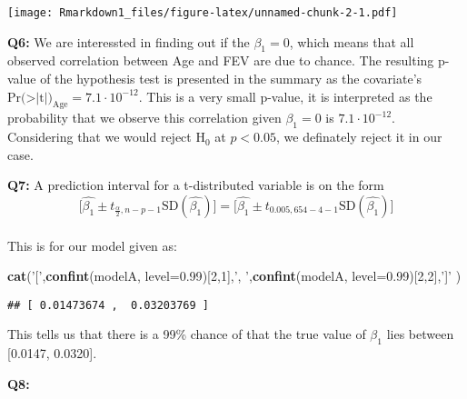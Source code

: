 \documentclass[]{article}
\newenvironment{Shaded}{\begin{snugshade}}{\end{snugshade}}
\newcommand{\KeywordTok}[1]{\textcolor[rgb]{0.13,0.29,0.53}{\textbf{#1}}}
\newcommand{\DataTypeTok}[1]{\textcolor[rgb]{0.13,0.29,0.53}{#1}}
\newcommand{\DecValTok}[1]{\textcolor[rgb]{0.00,0.00,0.81}{#1}}
\newcommand{\FloatTok}[1]{\textcolor[rgb]{0.00,0.00,0.81}{#1}}
\newcommand{\StringTok}[1]{\textcolor[rgb]{0.31,0.60,0.02}{#1}}
\newcommand{\NormalTok}[1]{#1}
\begin{document}
\texttt{[image: Rmarkdown1\_files/figure-latex/unnamed-chunk-2-1.pdf]}

\textbf{Q6:} We are interessted in finding out if the \(\beta_1 = 0\),
which means that all observed correlation between Age and FEV are due to
chance. The resulting p-value of the hypothesis test is presented in the
summary as the covariate's
\(\text{Pr(>|t|)}_{\text{Age}} = 7.1\cdot 10^{-12}\). This is a very
small p-value, it is interpreted as the probability that we observe this
correlation given \(\beta_1 = 0\) is \(7.1 \cdot 10^{-12}\). Considering
that we would reject \(\text{H}_0\) at \(p < 0.05\), we definately
reject it in our case.

\textbf{Q7:} A prediction interval for a t-distributed variable is on
the form
\[\Bigg[ \hat{\beta_1} \pm t_{\frac{\alpha}{2}, n-p-1}\text{SD}(\hat{\beta_1}) \Bigg] = \Bigg[ \hat{\beta_1} \pm t_{0.005,654-4-1}\text{SD}(\hat{\beta_1}) \Bigg] \]\\
This is for our model given as:

\begin{Shaded}
\begin{Highlighting}[]
\KeywordTok{cat}\NormalTok{(}\StringTok{'['}\NormalTok{,}\KeywordTok{confint}\NormalTok{(modelA, }\DataTypeTok{level=}\FloatTok{0.99}\NormalTok{)[}\DecValTok{2}\NormalTok{,}\DecValTok{1}\NormalTok{],}\StringTok{', '}\NormalTok{,}\KeywordTok{confint}\NormalTok{(modelA, }\DataTypeTok{level=}\FloatTok{0.99}\NormalTok{)[}\DecValTok{2}\NormalTok{,}\DecValTok{2}\NormalTok{],}\StringTok{']'}\NormalTok{ )}
\end{Highlighting}
\end{Shaded}

\begin{verbatim}
## [ 0.01473674 ,  0.03203769 ]
\end{verbatim}

This tells us that there is a 99\% chance of that the true value of
\(\beta_1\) lies between {[}0.0147, 0.0320{]}.

\textbf{Q8:}
\end{document}
